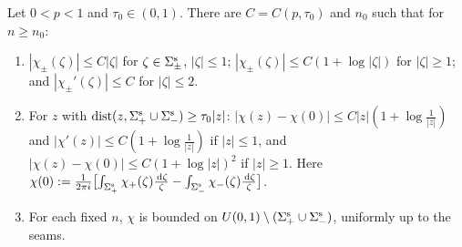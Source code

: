 \begin{lemma}\label{lem:corner}
Let $0<p<1$ and $\tau_0\in(0,1)$. There are $C=C(p,\tau_0)$ and $n_0$ such that for $n\ge n_0$:
\begin{enumerate}
\item[(i)] $|\chi_\pm(\zeta)|\le C|\zeta|$ for $\zeta\in\Sigma^{\mathrm{s}}_\pm$, $|\zeta|\le1$; $|\chi_\pm(\zeta)|\le C(1+\log|\zeta|)$ for
  $|\zeta|\ge1$; and $|\chi_\pm'(\zeta)|\le C$ for $|\zeta|\le2$.
\item[(ii)] For $z$ with $\mathrm{dist}(z,\Sigma^{\mathrm{s}}_+\cup\Sigma^{\mathrm{s}}_-)\ge\tau_0|z|$:
  $|\chi(z)-\chi(0)|\le C|z|(1+\log\frac1{|z|})$ and $|\chi'(z)|\le C(1+\log\frac1{|z|})$ if $|z|\le1$, and
  $|\chi(z)-\chi(0)|\le C(1+\log|z|)^2$ if $|z|\ge1$. Here
  $\chi(0):=\frac1{2\pi i}\bigl[\int_{\Sigma^{\mathrm{s}}_+}\chi_+(\zeta)\frac{\,\mathrm{d}\zeta}\zeta-\int_{\Sigma^{\mathrm{s}}_-}\chi_-(\zeta)\frac{\,\mathrm{d}\zeta}\zeta\bigr]$.
\item[(iii)] For each fixed $n$, $\chi$ is bounded on $U(0,1)\setminus(\Sigma^{\mathrm{s}}_+\cup\Sigma^{\mathrm{s}}_-)$, uniformly up to the seams.
\end{enumerate}
\end{lemma}

